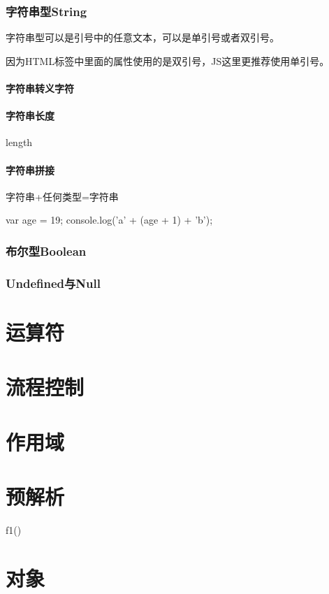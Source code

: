 \subsubsection{字符串型String}
字符串型可以是引号中的任意文本，可以是单引号或者双引号。

因为HTML标签中里面的属性使用的是双引号，JS这里更推荐使用单引号。
\paragraph{字符串转义字符}
\paragraph{字符串长度}
length
\paragraph{字符串拼接}
字符串+任何类型=字符串
\begin{js}
var age = 19;
console.log('a' + (age + 1) + 'b');
\end{js}

\subsubsection{布尔型Boolean}
\subsubsection{Undefined与Null}
\section{运算符}
\section{流程控制}

\section{作用域}

\section{预解析}

\begin{js}
	f1()
\end{js}
\section{对象}
